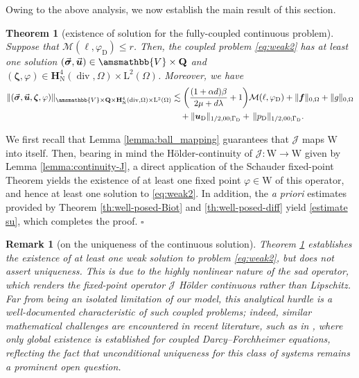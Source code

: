 \documentclass[fleqn,a4paper]{cas-sc}
\newcommand\vdiv{\mathop{\mathrm{div}}\nolimits}
\newcommand{\bu}{\boldsymbol{u}}
\newcommand{\ff}{\boldsymbol{f}}
\newcommand{\bzeta}{\boldsymbol{\zeta}}
\newcommand{\0}{\boldsymbol{0}}
\newcommand\bQ{\mathbf{Q}}
\newcommand\bbV{\amsmathbb{V}}
\newcommand\bH{\mathbf{H}}
\newcommand\rL{\mathrm{L}}
\newcommand\rW{\mathrm{W}}
\newcommand\bsigma{\boldsymbol{\sigma}}
\numberwithin{equation}{section}
\numberwithin{figure}{section}
\newtheorem{remark}{Remark}[section]
\newtheorem{theorem}{Theorem}[section]
\newenvironment{proof}{\noindent{\it Proof.}}{\hfill$\square$}
\begin{document}
 Owing to the above analysis, we now establish the main result of this section.
\begin{theorem}[existence of solution for the fully-coupled continuous problem]\label{th:J-unique-solvability-fixed}
 Suppose that $\mathcal{M}(\ell, \varphi_{\mathrm{D}}) \leq r$.  Then, the coupled problem \eqref{eq:weak2} has at least one solution $(\vec{\bsigma}, \vec{\bu}) \in \bbV \times \bQ$ and $( \bzeta, \varphi) \in   \bH^{4}_{\mathrm{N}}(\vdiv,\Omega) \times \rL^2(\Omega)$. Moreover, we have 
\begin{align}
    \|(\vec{\bsigma}, \vec{\bu},\bzeta, \varphi)\|_{\bbV \times \bQ \times \bH^{4}_{\mathrm{N}}(\vdiv,\Omega) \times \rL^2(\Omega)}  &  \lesssim \biggl(\frac{(1+\alpha d)\beta}{2\mu + d\lambda}+1\biggr)\mathcal{M}(\ell, \varphi_{\mathrm{D}}) + \|\ff\|_{0,\Omega}  + \|g\|_{0,\Omega} \notag \\ &\quad + \|\bu_{\mathrm{D}}\|_{1/2,00;\Gamma_{\mathrm{D}}} +\, \|p_{\mathrm{D}}\|_{1/2,00;\Gamma_{\mathrm{D}}}. \label{estimate su}
\end{align}
\end{theorem}
\begin{proof}
We first recall that Lemma \ref{lemma:ball_mapping} guarantees that $\mathcal{J}$ maps $\rW$ into itself. Then, bearing in mind the Hölder-continuity of $\mathcal{J} : \rW \to \rW$ given by Lemma \ref{lemma:continuity-J}, a direct application of the Schauder fixed-point Theorem yields the existence of at least one fixed point $\varphi \in \rW$ of this operator, and hence at least one solution to \eqref{eq:weak2}. In addition, the {\it a priori} estimates provided by Theorem \ref{th:well-posed-Biot} and \ref{th:well-posed-diff} yield \eqref{estimate su}, which completes the proof.
\end{proof}

\begin{remark}[on the uniqueness of the continuous solution]Theorem \ref{th:J-unique-solvability-fixed} establishes the existence of at least one weak solution to problem \eqref{eq:weak2}, but does not assert uniqueness. This is due to the highly nonlinear nature of the \gls{sad} operator, which renders the fixed-point operator $\mathcal{J}$ H\"{o}lder continuous rather than Lipschitz. Far from being an isolated limitation of our model, this analytical hurdle is a well-documented characteristic of such coupled problems; indeed, similar mathematical challenges are encountered in recent literature, such as in \cite{Allendes2023}, where only global existence is established for coupled Darcy--Forchheimer equations, reflecting the fact that unconditional uniqueness for this class of systems remains a prominent open question.
\end{remark}
\end{document}
